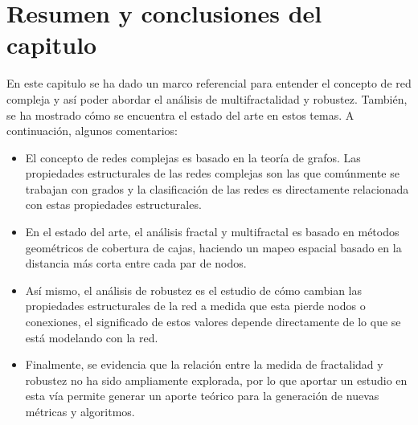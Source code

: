 \section{Resumen y conclusiones del capitulo}

En este capitulo se ha dado un marco referencial para entender el concepto de red compleja y así poder abordar el análisis de multifractalidad y robustez. También, se ha mostrado cómo se encuentra el estado del arte en estos temas. A continuación, algunos comentarios:

\begin{itemize}
    \item El concepto de redes complejas es basado en la teoría de grafos. Las propiedades estructurales de las redes complejas son las que comúnmente se trabajan con grados y la clasificación de las redes es directamente relacionada con estas propiedades estructurales.
    \item En el estado del arte, el análisis fractal y multifractal es basado en métodos geométricos de cobertura de cajas, haciendo un mapeo espacial basado en la distancia más corta entre cada par de nodos.
    \item Así mismo, el análisis de robustez es el estudio de cómo cambian las propiedades estructurales de la red a medida que esta pierde nodos o conexiones, el significado de estos valores depende directamente de lo que se está modelando con la red.
    \item Finalmente, se evidencia que la relación entre la medida de fractalidad y robustez no ha sido ampliamente explorada, por lo que aportar un estudio en esta vía permite generar un aporte teórico para la generación de nuevas métricas y algoritmos.
\end{itemize}